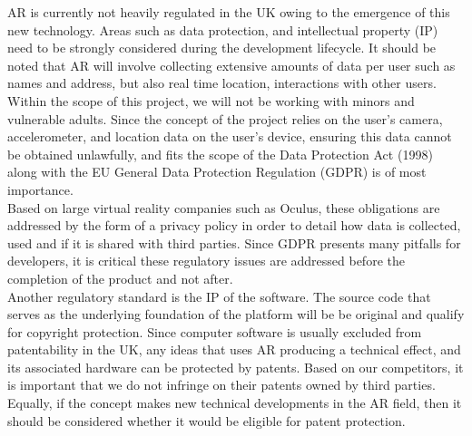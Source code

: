 
AR is currently not heavily regulated in the UK owing to the emergence of this new technology. Areas such as data protection, and intellectual property (IP) need to be strongly considered during the development lifecycle. It should be noted that AR will involve collecting extensive amounts of data per user such as names and address, but also real time location, interactions with other users. Within the scope of this project, we will not be working with minors and vulnerable adults. Since the concept of the project relies on the user's camera, accelerometer, and location data on the user's device, ensuring this data cannot be obtained unlawfully, and fits the scope of the Data Protection Act (1998) along with the EU General Data Protection Regulation (GDPR) is of most importance.\cite{ITProPortal}\\

Based on large virtual reality companies such as Oculus, these obligations are addressed by the form of a privacy policy in order to detail how data is collected, used and if it is shared with third parties. Since GDPR presents many pitfalls for developers, it is critical these regulatory issues are addressed before the completion of the product and not after.\\

Another regulatory standard is the IP of the software. The source code that serves as the underlying foundation of the platform will be be original and qualify for copyright protection. Since computer software is usually excluded from patentability in the UK, any ideas that uses AR producing a technical effect, and its associated hardware can be protected by patents. Based on our competitors, it is important that we do not infringe on their patents owned by third parties. Equally, if the concept makes new technical developments in the AR field, then it should be considered whether it would be eligible for patent protection.\\

